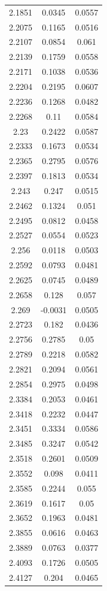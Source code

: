 \documentclass[twocolumn,tight,times]{aastex63}
\begin{document}
\begin{center}
\begin{longtable}{c|c|c}
2.1851 & 0.0345 & 0.0557 \\
2.2075 & 0.1165 & 0.0516 \\
2.2107 & 0.0854 & 0.061 \\
2.2139 & 0.1759 & 0.0558 \\
2.2171 & 0.1038 & 0.0536 \\
2.2204 & 0.2195 & 0.0607 \\
2.2236 & 0.1268 & 0.0482 \\
2.2268 & 0.11 & 0.0584 \\
2.23 & 0.2422 & 0.0587 \\
2.2333 & 0.1673 & 0.0534 \\
2.2365 & 0.2795 & 0.0576 \\
2.2397 & 0.1813 & 0.0534 \\
2.243 & 0.247 & 0.0515 \\
2.2462 & 0.1324 & 0.051 \\
2.2495 & 0.0812 & 0.0458 \\
2.2527 & 0.0554 & 0.0523 \\
2.256 & 0.0118 & 0.0503 \\
2.2592 & 0.0793 & 0.0481 \\
2.2625 & 0.0745 & 0.0489 \\
2.2658 & 0.128 & 0.057 \\
2.269 & -0.0031 & 0.0505 \\
2.2723 & 0.182 & 0.0436 \\
2.2756 & 0.2785 & 0.05 \\
2.2789 & 0.2218 & 0.0582 \\
2.2821 & 0.2094 & 0.0561 \\
2.2854 & 0.2975 & 0.0498 \\
2.3384 & 0.2053 & 0.0461 \\
2.3418 & 0.2232 & 0.0447 \\
2.3451 & 0.3334 & 0.0586 \\
2.3485 & 0.3247 & 0.0542 \\
2.3518 & 0.2601 & 0.0509 \\
2.3552 & 0.098 & 0.0411 \\
2.3585 & 0.2244 & 0.055 \\
2.3619 & 0.1617 & 0.05 \\
2.3652 & 0.1963 & 0.0481 \\
2.3855 & 0.0616 & 0.0463 \\
2.3889 & 0.0763 & 0.0377 \\
2.4093 & 0.1726 & 0.0505 \\
2.4127 & 0.204 & 0.0465 \\

\end{longtable}
\end{center}
\end{document}
